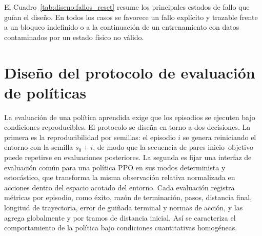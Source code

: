 El Cuadro~\ref{tab:diseno:fallos_reset} resume los principales estados de fallo
que guían el diseño. En todos los casos se favorece un fallo explícito y
trazable frente a un bloqueo indefinido o a la continuación de un entrenamiento
con datos contaminados por un estado físico no válido.


\section{Diseño del protocolo de evaluación de políticas} \label{sct:diseno:evaluacion}

La evaluación de una política aprendida exige que los episodios se ejecuten bajo
condiciones reproducibles. El protocolo se diseña en torno a dos decisiones. La
primera es la reproducibilidad por semillas: el episodio $i$ se genera
reiniciando el entorno con la semilla $s_0 + i$, de modo que la secuencia de
pares inicio--objetivo puede repetirse en evaluaciones posteriores. La segunda
es fijar una interfaz de evaluación común para una política PPO en sus modos
determinista y estocástico, que transforma la misma observación relativa
normalizada en acciones dentro del espacio acotado del entorno. Cada evaluación
registra métricas por episodio, como éxito, razón de terminación, pasos,
distancia final, longitud de trayectoria, error de guiñada terminal y normas de
acción, y las agrega globalmente y por tramos de distancia inicial. Así se
caracteriza el comportamiento de la política bajo condiciones cuantitativas
homogéneas.
